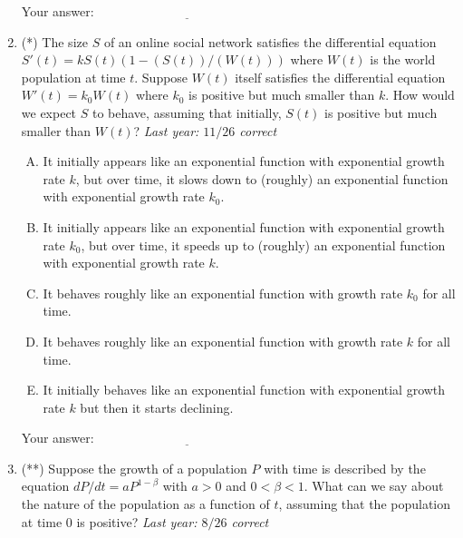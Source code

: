 \documentclass[10pt]{amsart}
\begin{document}
\begin{enumerate}
  \vspace{0.1in}
  Your answer: $\underline{\qquad\qquad\qquad\qquad\qquad\qquad\qquad}$
  \vspace{0.15in}

\item (*) The size $S$ of an online social network satisfies the
  differential equation $S'(t) = kS(t)(1 - (S(t))/(W(t)))$ where
  $W(t)$ is the world population at time $t$. Suppose $W(t)$ itself
  satisfies the differential equation $W'(t) = k_0W(t)$ where $k_0$ is
  positive but much smaller than $k$. How would we expect $S$ to
  behave, assuming that initially, $S(t)$ is positive but much smaller
  than $W(t)$? {\em Last year: $11/26$ correct}

  \begin{enumerate}[(A)]
  \item It initially appears like an exponential function with
    exponential growth rate $k$, but over time, it slows down to
    (roughly) an exponential function with exponential growth rate
    $k_0$.
  \item It initially appears like an exponential function with
    exponential growth rate $k_0$, but over time, it speeds up to
    (roughly) an exponential function with exponential growth rate $k$.
  \item It behaves roughly like an exponential function with growth
    rate $k_0$ for all time.
  \item It behaves roughly like an exponential function with growth
    rate $k$ for all time.
  \item It initially behaves like an exponential function with
    exponential growth rate $k$ but then it starts declining.
  \end{enumerate}

  \vspace{0.1in}
  Your answer: $\underline{\qquad\qquad\qquad\qquad\qquad\qquad\qquad}$
  \vspace{0.15in}

\item (**) Suppose the growth of a population $P$ with time is
  described by the equation $dP/dt = aP^{1 - \beta}$ with $a > 0$ and
  $0 < \beta < 1$. What can we say about the nature of the population
  as a function of $t$, assuming that the population at time $0$ is
  positive? {\em Last year: $8/26$ correct}


\end{enumerate}
\end{document}
